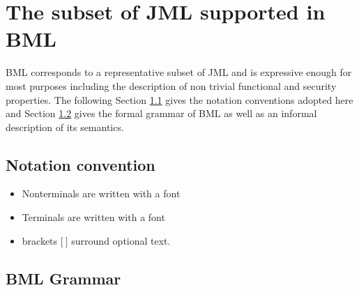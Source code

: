 



\newtheorem{bml}{Definition}[section]

\section{The subset of JML supported in BML} \label{BCSLgrammar}


BML corresponds to a representative subset of JML and is expressive enough for most purposes including the description of non trivial functional and 
 security properties. The following Section \ref{bml:notation} gives the notation conventions adopted here and 
Section  \ref{BCSL} gives the formal grammar of  BML as well as an informal description of its semantics. 

\subsection{Notation convention}\label{bml:notation}


\begin{itemize}
     \item Nonterminals are written with a \nonterminal font
     \item Terminals are written with a \terminal font
     \item brackets  $\lbrack \ \rbrack $ surround optional text.
\end{itemize}


\subsection{BML Grammar}\label{BCSL}

